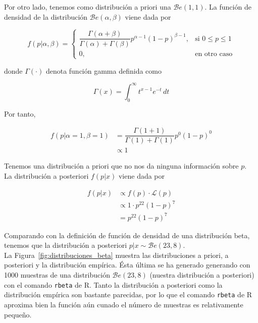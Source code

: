 \documentclass[12pt,a4paper,twoside,openright,titlepage,final]{article}
\begin{document}
Por otro lado, tenemos como distribución a priori una $\mathcal{B}e(1,1)$. La función de densidad de la distribución $\mathcal{B}e(\alpha, \beta)$ viene dada por

\begin{equation*}
f(p|\alpha, \beta) = \begin{cases}
\dfrac{\Gamma(\alpha + \beta)}{\Gamma(\alpha) + \Gamma(\beta)}p^{\alpha - 1}(1-p)^{\beta - 1}, & \text{si } 0 \leq p \leq 1\\
0, & \text{en otro caso} 
\end{cases}
\end{equation*} 

donde $\Gamma(\cdot)$ denota función gamma definida como

\begin{equation*}
\Gamma(x) = \int_{0}^{\infty} t^{x-1}e^{-t} \, dt
\end{equation*}

Por tanto,

\begin{align*}
f(p | \alpha = 1, \beta = 1) & = \dfrac{\Gamma(1 + 1)}{\Gamma(1) + \Gamma(1)}p^{0}(1-p)^{0} \\ & \propto 1 
\end{align*}

Tenemos una distribución a priori que no nos da ninguna información sobre $p$.\\

La distribución a posteriori $f(p|x)$ viene dada por

\begin{align*}
f(p|x) & \propto f(p) \cdot \mathcal{L}(p) \\ & \propto 1 \cdot p^{22}(1-p)^{7} \\ & = p^{22}(1-p)^{7}
\end{align*}

Comparando con la definición de función de densidad de una distribución beta, tenemos que la distribución a posteriori $p|x \sim \mathcal{B}e(23,8)$.\\

La Figura~\ref{fig:distribuciones_beta} muestra las distribuciones a priori, a posteriori y la distribución empírica. Ésta última se ha generado generando con 1000 muestras de una distribución $\mathcal{B}e(23,8)$ (nuestra distribución a posteriori) con el comando \texttt{rbeta} de R. Tanto la distribución a posteriori como la distribución empírica son bastante parecidas, por lo que el comando \texttt{rbeta} de R aproxima bien la función aún cunado el número de muestras es relativamente pequeño.\\
\end{document}
